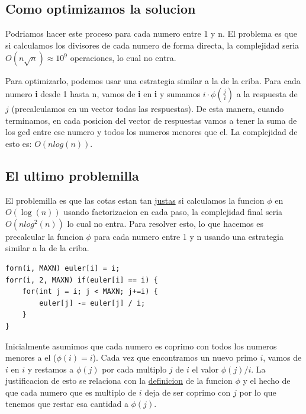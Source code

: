 \documentclass{article}
\begin{document}
\subsection{Como optimizamos la solucion}
Podriamos hacer este proceso para cada numero entre 1 y n. El problema es que si calculamos los divisores de cada numero de forma directa, la complejidad seria $O(n \sqrt{n}) \approx 10^9$ operaciones, lo cual no entra. 

Para optimizarlo, podemos usar una estrategia similar a la de la criba. Para cada numero \textbf{i} desde 1 hasta n, vamos de \textbf{i} en \textbf{i} y sumamos $i \cdot \phi(\frac{j}{i})$ a la respuesta de $j$ (precalculamos en un vector todas las respuestas). De esta manera, cuando terminamos, en cada posicion del vector de respuestas vamos a tener la suma de los gcd entre ese numero y todos los numeros menores que el. La complejidad de esto es: $O(nlog(n))$.

\subsection{El ultimo problemilla}
El problemilla es que las cotas estan tan \href{https://www.youtube.com/watch?v=qLHLsbD9emc}{justas} si calculamos la funcion $\phi$ en $O(\log(n))$ usando factorizacion en cada paso, la complejidad final seria $O(nlog^2(n))$ lo cual no entra. Para resolver esto, lo que hacemos es precalcular la funcion $\phi$ para cada numero entre 1 y n usando una estrategia similar a la de la criba. 

\begin{lstlisting}[caption=Precalculo de todos los valores de la funcion $\phi$]
forn(i, MAXN) euler[i] = i;
forr(i, 2, MAXN) if(euler[i] == i) {
    for(int j = i; j < MAXN; j+=i) {
        euler[j] -= euler[j] / i;
    }
}
\end{lstlisting}

Inicialmente asumimos que cada numero es coprimo con todos los numeros menores a el ($\phi(i) = i$). Cada vez que encontramos un nuevo primo $i$, vamos de $i$ en $i$ y restamos a $\phi(j)$ por cada multiplo $j$ de $i$ el valor $\phi(j) / i$. La justificacion de esto se relaciona con la \href{https://en.wikipedia.org/wiki/Euler%27s_totient_function}{definicion} de la funcion $\phi$ y el hecho de que cada numero que es multiplo de $i$ deja de ser coprimo con $j$ por lo que tenemos que restar esa cantidad a $\phi(j)$.



\newpage
\end{document}
